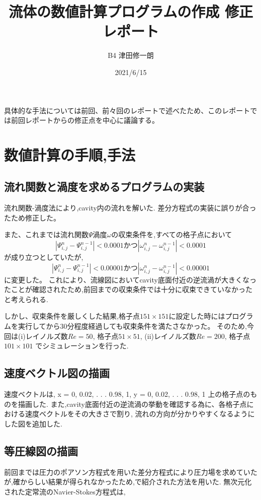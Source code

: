 \documentclass[upLaTeX,a4paper]{jsarticle}
\title{流体の数値計算プログラムの作成 修正レポート}
\author{B4 津田修一朗}
\date{2021/6/15}
\begin{document}
\maketitle

具体的な手法については前回、前々回のレポートで述べたため、このレポートでは前回レポートからの修正点を中心に議論する。

\section{数値計算の手順,手法}
\subsection{流れ関数と渦度を求めるプログラムの実装}
流れ関数-渦度法により,cavity内の流れを解いた.
差分方程式の実装に誤りが合ったため修正した。

また、これまでは流れ関数$\varPsi$渦度$\omega$の収束条件を,すべての格子点において
\begin{equation}
  |\varPsi^n_{i,j}-\varPsi^{n-1}_{i,j}| < 0.0001  かつ  |\omega^n_{i,j}-\omega^{n-1}_{i,j}| < 0.0001
\end{equation}
が成り立つとしていたが,
\begin{equation}
  |\varPsi^n_{i,j}-\varPsi^{n-1}_{i,j}| < 0.00001  かつ  |\omega^n_{i,j}-\omega^{n-1}_{i,j}| < 0.00001
\end{equation}
に変更した。
これにより、流線図においてcavity底面付近の逆流渦が大きくなったことが確認されたため,前回までの収束条件では十分に収束できていなかったと考えられる.

しかし、収束条件を厳しくした結果,格子点$151 × 151$に設定した時にはプログラムを実行してから30分程度経過しても収束条件を満たさなかった。
そのため,今回は(i)レイノルズ数$Re = 50$, 格子点$51\times 51$, (ii)レイノルズ数$Re = 200$, 格子点$101\times 101$
でシミュレーションを行った.

\subsection{速度ベクトル図の描画}
速度ベクトルは, x = 0, 0.02, . . . 0.98, 1, y = 0, 0.02, . . . 0.98, 1 上の格子点のものを描画した.
また,cavity底面付近の逆流渦の挙動を確認する為に、各格子点における速度ベクトルをその大きさで割り,
流れの方向が分かりやすくなるようにした図を追加した.

\subsection{等圧線図の描画}
前回までは圧力のポアソン方程式を用いた差分方程式により圧力場を求めていたが,確からしい結果が得られなかったため,\cite{2}で紹介された方法を用いた.
無次元化された定常流のNavier-Stokes方程式は,
\end{document}
